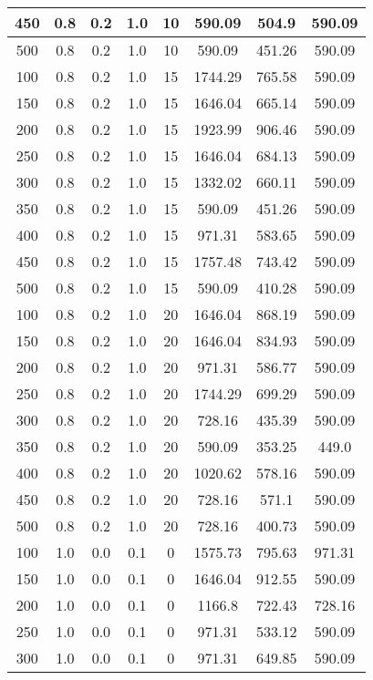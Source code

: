 \documentclass[a4paper, 12pt]{extreport}
\begin{document}
\begin{itemize}
\begin{longtable}{|c|c|c|c|c|c|c|c|}
			450 & 0.8 & 0.2 & 1.0 & 10 & 590.09 & 504.9 & 590.09 \\\hline
			500 & 0.8 & 0.2 & 1.0 & 10 & 590.09 & 451.26 & 590.09 \\\hline
			100 & 0.8 & 0.2 & 1.0 & 15 & 1744.29 & 765.58 & 590.09 \\\hline
			150 & 0.8 & 0.2 & 1.0 & 15 & 1646.04 & 665.14 & 590.09 \\\hline
			200 & 0.8 & 0.2 & 1.0 & 15 & 1923.99 & 906.46 & 590.09 \\\hline
			250 & 0.8 & 0.2 & 1.0 & 15 & 1646.04 & 684.13 & 590.09 \\\hline
			300 & 0.8 & 0.2 & 1.0 & 15 & 1332.02 & 660.11 & 590.09 \\\hline
			350 & 0.8 & 0.2 & 1.0 & 15 & 590.09 & 451.26 & 590.09 \\\hline
			400 & 0.8 & 0.2 & 1.0 & 15 & 971.31 & 583.65 & 590.09 \\\hline
			450 & 0.8 & 0.2 & 1.0 & 15 & 1757.48 & 743.42 & 590.09 \\\hline
			500 & 0.8 & 0.2 & 1.0 & 15 & 590.09 & 410.28 & 590.09 \\\hline
			100 & 0.8 & 0.2 & 1.0 & 20 & 1646.04 & 868.19 & 590.09 \\\hline
			150 & 0.8 & 0.2 & 1.0 & 20 & 1646.04 & 834.93 & 590.09 \\\hline
			200 & 0.8 & 0.2 & 1.0 & 20 & 971.31 & 586.77 & 590.09 \\\hline
			250 & 0.8 & 0.2 & 1.0 & 20 & 1744.29 & 699.29 & 590.09 \\\hline
			300 & 0.8 & 0.2 & 1.0 & 20 & 728.16 & 435.39 & 590.09 \\\hline
			350 & 0.8 & 0.2 & 1.0 & 20 & 590.09 & 353.25 & 449.0 \\\hline
			400 & 0.8 & 0.2 & 1.0 & 20 & 1020.62 & 578.16 & 590.09 \\\hline
			450 & 0.8 & 0.2 & 1.0 & 20 & 728.16 & 571.1 & 590.09 \\\hline
			500 & 0.8 & 0.2 & 1.0 & 20 & 728.16 & 400.73 & 590.09 \\\hline
			100 & 1.0 & 0.0 & 0.1 & 0 & 1575.73 & 795.63 & 971.31 \\\hline
			150 & 1.0 & 0.0 & 0.1 & 0 & 1646.04 & 912.55 & 590.09 \\\hline
			200 & 1.0 & 0.0 & 0.1 & 0 & 1166.8 & 722.43 & 728.16 \\\hline
			250 & 1.0 & 0.0 & 0.1 & 0 & 971.31 & 533.12 & 590.09 \\\hline
			300 & 1.0 & 0.0 & 0.1 & 0 & 971.31 & 649.85 & 590.09 \\\hline

\end{longtable}
\end{itemize}
\end{document}
